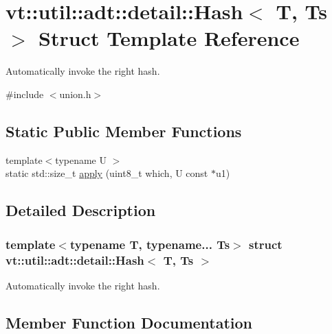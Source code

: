 \hypertarget{structvt_1_1util_1_1adt_1_1detail_1_1_hash}{}\section{vt\+:\+:util\+:\+:adt\+:\+:detail\+:\+:Hash$<$ T, Ts $>$ Struct Template Reference}
\label{structvt_1_1util_1_1adt_1_1detail_1_1_hash}


Automatically invoke the right hash.  




{\ttfamily \#include $<$union.\+h$>$}

\subsection*{Static Public Member Functions}
\begin{DoxyCompactItemize}
\item 
{\footnotesize template$<$typename U $>$ }\\static std\+::size\+\_\+t \hyperlink{structvt_1_1util_1_1adt_1_1detail_1_1_hash_a0a6ed44f515b45172fa095cfe1413b94}{apply} (uint8\+\_\+t which, U const $\ast$u1)
\end{DoxyCompactItemize}


\subsection{Detailed Description}
\subsubsection*{template$<$typename T, typename... Ts$>$\newline
struct vt\+::util\+::adt\+::detail\+::\+Hash$<$ T, Ts $>$}

Automatically invoke the right hash. 

\subsection{Member Function Documentation}
\mbox{\label{structvt_1_1util_1_1adt_1_1detail_1_1_hash_a0a6ed44f515b45172fa095cfe1413b94}} 
